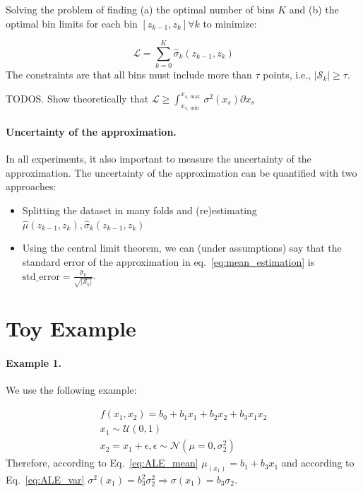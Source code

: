 \documentclass{article}
\begin{document}
Solving the problem of finding (a) the optimal number of bins \(K\) and (b) the optimal bin limits for each bin \([z_{k-1}, z_k] \forall k\) to minimize:

\begin{equation}
  \label{eq:1}
  \mathcal{L} = \sum_{k=0}^K \hat{\sigma}_k(z_{k-1}, z_k)
\end{equation}
%
The constraints are that all bins must include more than \(\tau\)
points, i.e., \(|\mathcal{S}_k| \geq \tau\).

\noindent
TODOS. Show theoretically that \(\mathcal{L} \geq \int_{x_{s, \min}}^{x_{s, \max}}\sigma^2(x_s) \partial x_s\)

\paragraph{Uncertainty of the approximation.}

In all experiments, it also important to measure the uncertainty of
the approximation.
The uncertainty of the approximation can be
quantified with two approaches:

\begin{itemize}
\item Splitting the dataset in many folds and (re)estimating
  \(\hat{\mu}(z_{k-1}, z_k), \hat{\sigma}_k(z_{k-1}, z_k)\)
\item Using the central limit theorem, we can (under assumptions) say
  that the standard error of the approximation in
  eq.~\eqref{eq:mean_estimation} is
  \(\mathrm{std\_error} =
  \frac{\hat{\sigma}_k}{\sqrt{|\mathcal{S}_k|}}\).
\end{itemize}

\section{Toy Example}
\label{sec:toy-example}

\paragraph{Example 1.} We use the following example:

\begin{equation}
  \label{eq:model_1}
  \begin{gathered}
    f(x_1, x_2) = b_0 + b_1 x_1 + b_2 x_2 + b_3 x_1 x_2\\
    x_1 \sim \mathcal{U}(0,1) \\
    x_2 = x_1 + \epsilon, \epsilon \sim \mathcal{N}(\mu=0, \sigma_2^2)
  \end{gathered}
\end{equation}
%
Therefore, according to Eq.~\eqref{eq:ALE_mean}
\(\mu_(x_1) = b_1 + b_3 x_1\) and according to Eq.~\eqref{eq:ALE_var}
\(\sigma^2(x_1) = b_3^2 \sigma_2^2 \Rightarrow \sigma(x_1) = b_3
\sigma_2 \).
\end{document}
